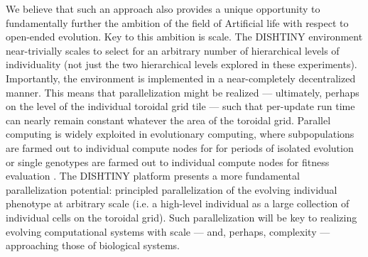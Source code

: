 We believe that such an approach also provides a unique opportunity to fundamentally further the ambition of the field of Artificial life with respect to open-ended evolution.
Key to this ambition is scale.
The DISHTINY environment near-trivially scales to select for an arbitrary number of hierarchical levels of individuality (not just the two hierarchical levels explored in these experiments).
Importantly, the environment is implemented in a near-completely decentralized manner.
This means that parallelization might be realized --- ultimately, perhaps on the level of the individual toroidal grid tile --- such that per-update run time can nearly remain constant whatever the area of the toroidal grid.
Parallel computing is widely exploited in evolutionary computing, where subpopulations are farmed out to individual compute nodes for for periods of isolated evolution or single genotypes are farmed out to individual compute nodes for fitness evaluation \citep{lin1994coarse, real17a}.
The DISHTINY platform presents a more fundamental parallelization potential: principled parallelization of the evolving individual phenotype at arbitrary scale (i.e. a high-level individual as a large collection of individual cells on the toroidal grid).
Such parallelization will be key to realizing evolving computational systems with scale --- and, perhaps, complexity --- approaching those of biological systems.

